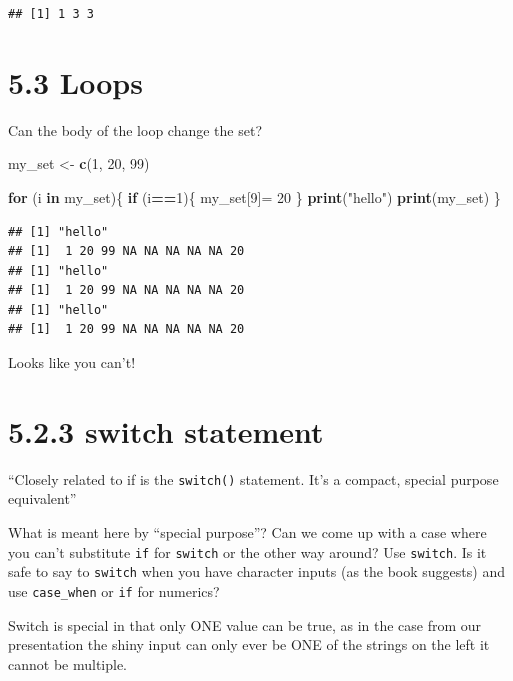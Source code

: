 \documentclass[]{book}
\newenvironment{Shaded}{\begin{snugshade}}{\end{snugshade}}
\newcommand{\ControlFlowTok}[1]{\textcolor[rgb]{0.13,0.29,0.53}{\textbf{#1}}}
\newcommand{\DecValTok}[1]{\textcolor[rgb]{0.00,0.00,0.81}{#1}}
\newcommand{\KeywordTok}[1]{\textcolor[rgb]{0.13,0.29,0.53}{\textbf{#1}}}
\newcommand{\NormalTok}[1]{#1}
\newcommand{\OperatorTok}[1]{\textcolor[rgb]{0.81,0.36,0.00}{\textbf{#1}}}
\newcommand{\StringTok}[1]{\textcolor[rgb]{0.31,0.60,0.02}{#1}}
\begin{document}
\begin{verbatim}
## [1] 1 3 3
\end{verbatim}

\hypertarget{loops}{%
\section*{5.3 Loops}\label{loops}}

Can the body of the loop change the set?

\begin{Shaded}
\begin{Highlighting}[]
\NormalTok{my_set <-}\StringTok{ }\KeywordTok{c}\NormalTok{(}\DecValTok{1}\NormalTok{, }\DecValTok{20}\NormalTok{, }\DecValTok{99}\NormalTok{)}

\ControlFlowTok{for}\NormalTok{ (i }\ControlFlowTok{in}\NormalTok{ my_set)\{}
  \ControlFlowTok{if}\NormalTok{ (i}\OperatorTok{==}\DecValTok{1}\NormalTok{)\{}
\NormalTok{    my_set[}\DecValTok{9}\NormalTok{]=}\StringTok{ }\DecValTok{20}
\NormalTok{    \}}
  \KeywordTok{print}\NormalTok{(}\StringTok{"hello"}\NormalTok{)}
  \KeywordTok{print}\NormalTok{(my_set)}
\NormalTok{  \}}
\end{Highlighting}
\end{Shaded}

\begin{verbatim}
## [1] "hello"
## [1]  1 20 99 NA NA NA NA NA 20
## [1] "hello"
## [1]  1 20 99 NA NA NA NA NA 20
## [1] "hello"
## [1]  1 20 99 NA NA NA NA NA 20
\end{verbatim}

Looks like you can't!

\hypertarget{switch}{%
\section*{5.2.3 switch statement}\label{switch}}

``Closely related to if is the \texttt{switch()} statement. It's a compact, special purpose equivalent''

What is meant here by ``special purpose''? Can we come up with a case where you can't substitute \texttt{if} for \texttt{switch} or the other way around? Use \texttt{switch}. Is it safe to say to \texttt{switch} when you have character inputs (as the book suggests) and use \texttt{case\_when} or \texttt{if} for numerics?

Switch is special in that only ONE value can be true, as in the case from our presentation the shiny input can only ever be ONE of the strings on the left it cannot be multiple.
\end{document}
